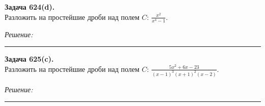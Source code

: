 \documentclass[a4paper, 12pt]{article}
\newenvironment{problem}[2][Задача]
    { \begin{mdframed}[backgroundcolor=gray!10] \textbf{#1 #2.} \\}
    {  \end{mdframed}}
\newenvironment{solution}
    {\textit{Решение: }}
    {\noindent\rule{7in}{1.5pt}}
\begin{document}
\begin{problem}{624(d)}
Разложить на простейшие дроби над полем $C$: $\frac{x^2}{x^4-1}$.
\end{problem}
\begin{solution}



\end{solution} 

\begin{problem}{625(c)}
Разложить на простейшие дроби над полем $C$: $\frac{5x^2+6x-23}{(x-1)^3(x+1)^2(x-2)}$.
\end{problem}
\begin{solution}



\end{solution} 


\end{document}
